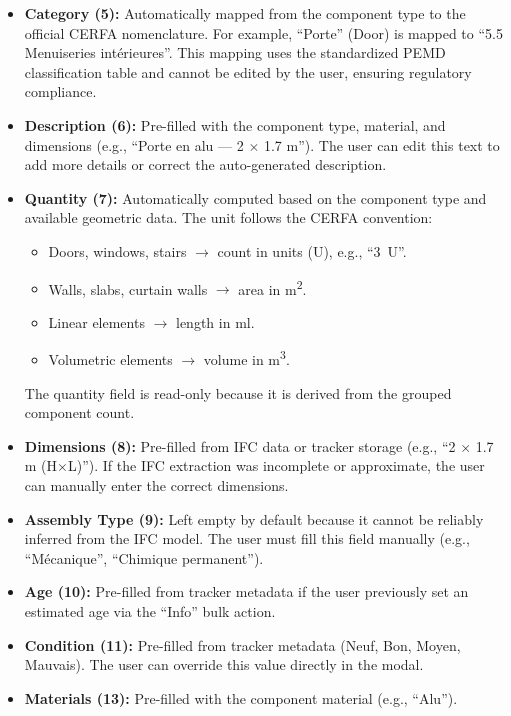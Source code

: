 \documentclass[11pt,a4paper]{article}
\begin{document}
\begin{itemize}
    \item \textbf{Category (5):} Automatically mapped from the component type to the official CERFA nomenclature. For example, ``Porte'' (Door) is mapped to ``5.5 Menuiseries int\'{e}rieures''. This mapping uses the standardized PEMD classification table and cannot be edited by the user, ensuring regulatory compliance.
    
    \item \textbf{Description (6):} Pre-filled with the component type, material, and dimensions (e.g., ``Porte en alu --- 2 $\times$ 1.7 m''). The user can edit this text to add more details or correct the auto-generated description.
    
    \item \textbf{Quantity (7):} Automatically computed based on the component type and available geometric data. The unit follows the CERFA convention:
        \begin{itemize}
            \item Doors, windows, stairs $\rightarrow$ count in units (U), e.g., ``3~U''.
            \item Walls, slabs, curtain walls $\rightarrow$ area in m\textsuperscript{2}.
            \item Linear elements $\rightarrow$ length in ml.
            \item Volumetric elements $\rightarrow$ volume in m\textsuperscript{3}.
        \end{itemize}
        The quantity field is read-only because it is derived from the grouped component count.
    
    \item \textbf{Dimensions (8):} Pre-filled from IFC data or tracker storage (e.g., ``2 $\times$ 1.7 m (H$\times$L)''). If the IFC extraction was incomplete or approximate, the user can manually enter the correct dimensions.
    
    \item \textbf{Assembly Type (9):} Left empty by default because it cannot be reliably inferred from the IFC model. The user must fill this field manually (e.g., ``M\'{e}canique'', ``Chimique permanent'').
    
    \item \textbf{Age (10):} Pre-filled from tracker metadata if the user previously set an estimated age via the ``Info'' bulk action.
    
    \item \textbf{Condition (11):} Pre-filled from tracker metadata (Neuf, Bon, Moyen, Mauvais). The user can override this value directly in the modal.
    
    \item \textbf{Materials (13):} Pre-filled with the component material (e.g., ``Alu'').
\end{itemize}
\end{document}
